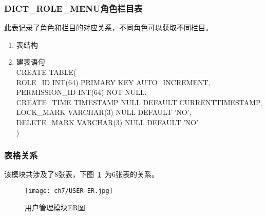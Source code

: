 \subsubsection{DICT\_ROLE\_MENU角色栏目表}
此表记录了角色和栏目的对应关系，不同角色可以获取不同栏目。
\begin{enumerate}
    \item 表结构
    \begin{table}[htbp]
        \centering
        \end{table}
    \item 建表语句\\
        CREATE TABLE(\\
            ROLE\_ID INT(64) PRIMARY KEY AUTO\_INCREMENT,\\
            PERMISSION\_ID INT(64) NOT NULL, \\
            CREATE\_TIME TIMESTAMP NULL DEFAULT CURRENTTIMESTAMP,\\
            LOCK\_MARK VARCHAR(3) NULL DEFAULT 'NO', \\            
            DELETE\_MARK VARCHAR(3) NULL DEFAULT 'NO'\\
        )
    \end{enumerate}

\subsubsection{表格关系}
该模块共涉及了8张表，下图~\ref{fig:USER-ER}~为6张表的关系。
\begin{figure}[htbp]
    \centering
    \texttt{[image: ch7/USER-ER.jpg]}
    \caption{用户管理模块ER图}\label{fig:USER-ER}
    \vspace{\baselineskip} %
\end{figure}

